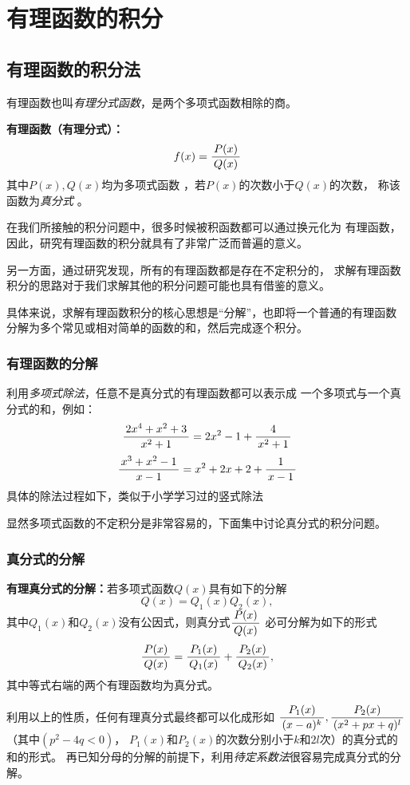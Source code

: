\section{有理函数的积分}

\subsection{有理函数的积分法}

有理函数也叫{\it 有理分式函数}，是两个多项式函数相除的商。

\begin{thx}
	{\bf 有理函数（有理分式）：}$$f(x)=\displaystyle\frac{\,{P(x)}\,}{\,{Q(x)}\,}$$
	其中$P(x),Q(x)$均为多项式函数 ，若$P(x)$的次数小于$Q(x)$的次数，
	称该函数为{\it 真分式} 。
\end{thx}

在我们所接触的积分问题中，很多时候被积函数都可以通过换元化为
有理函数，因此，研究有理函数的积分就具有了非常广泛而普遍的意义。

另一方面，通过研究发现，所有的有理函数都是存在不定积分的，
求解有理函数积分的思路对于我们求解其他的积分问题可能也具有借鉴的意义。

具体来说，求解有理函数积分的核心思想是“分解”，也即将一个普通的有理函数
分解为多个常见或相对简单的函数的和，然后完成逐个积分。

\subsubsection{有理函数的分解}

利用{\b\it 多项式除法}，任意不是真分式的有理函数都可以表示成
一个多项式与一个真分式的和，例如：
$$\displaystyle\frac{\,{2x^4+x^2+3}\,}{\,{x^2+1}\,}=2x^2-1+\displaystyle\frac{\,{4}\,}{\,{x^2+1}\,}$$
$$\displaystyle\frac{\,{x^3+x^2-1}\,}{\,{x-1}\,}=x^2+2x+2+\displaystyle\frac{\,{1}\,}{\,{x-1}\,}$$
具体的除法过程如下，类似于小学学习过的竖式除法
\begin{center}
\end{center}

显然多项式函数的不定积分是非常容易的，下面集中讨论真分式的积分问题。

\subsubsection{真分式的分解}

\begin{thx}
	{\bf 有理真分式的分解：}若多项式函数$Q(x)$具有如下的分解
	$$Q(x)=Q_1(x)Q_2(x),$$
	其中$Q_1(x)$和$Q_2(x)$没有公因式，则真分式$\displaystyle\frac{\,{P(x)}\,}{\,{Q(x)}\,}$
	必可分解为如下的形式
	$$\displaystyle\frac{\,{P(x)}\,}{\,{Q(x)}\,}=\displaystyle\frac{\,{P_1(x)}\,}{\,{Q_1(x)}\,}+\displaystyle\frac{\,{P_2(x)}\,}{\,{Q_2(x)}\,},$$
	其中等式右端的两个有理函数均为真分式。
\end{thx}
利用以上的性质，任何有理真分式最终都可以化成形如
$\displaystyle\frac{\,{P_1(x)}\,}{\,{(x-a)^k}\,},\displaystyle\frac{\,{P_2(x)}\,}{\,{(x^2+px+q)^l}\,}$（其中$(p^2-4q<0)$，
$P_1(x)$和$P_2(x)$的次数分别小于$k$和$2l$次）的真分式的和的形式。
再已知分母的分解的前提下，利用{\it 待定系数法}很容易完成真分式的分解。

